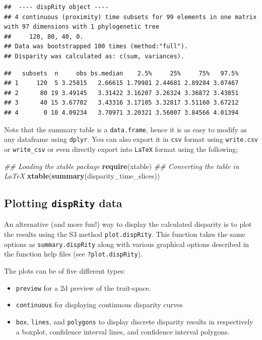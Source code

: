 \documentclass[]{book}
\newenvironment{Shaded}{\begin{snugshade}}{\end{snugshade}}
\newcommand{\CommentTok}[1]{\textcolor[rgb]{0.56,0.35,0.01}{\textit{#1}}}
\newcommand{\KeywordTok}[1]{\textcolor[rgb]{0.13,0.29,0.53}{\textbf{#1}}}
\newcommand{\NormalTok}[1]{#1}
\providecommand{\tightlist}{%
  \setlength{\itemsep}{0pt}\setlength{\parskip}{0pt}}
\begin{document}
\begin{verbatim}
##  ---- dispRity object ---- 
## 4 continuous (proximity) time subsets for 99 elements in one matrix with 97 dimensions with 1 phylogenetic tree
##     120, 80, 40, 0.
## Data was bootstrapped 100 times (method:"full").
## Disparity was calculated as: c(sum, variances).
\end{verbatim}

\begin{verbatim}
##   subsets  n     obs bs.median    2.5%     25%     75%   97.5%
## 1     120  5 3.25815   2.66615 1.79981 2.44681 2.89284 3.07467
## 2      80 19 3.49145   3.31422 3.16207 3.26324 3.36872 3.43851
## 3      40 15 3.67702   3.43316 3.17105 3.32817 3.51160 3.67212
## 4       0 10 4.09234   3.70971 3.20321 3.56007 3.84566 4.01394
\end{verbatim}

Note that the summary table is a \texttt{data.frame}, hence it is as easy to modify as any dataframe using \texttt{dplyr}.
You can also export it in \texttt{csv} format using \texttt{write.csv} or \texttt{write\_csv} or even directly export into \texttt{LaTeX} format using the following;

\begin{Shaded}
\begin{Highlighting}[]
\CommentTok{## Loading the xtable package}
\KeywordTok{require}\NormalTok{(xtable)}
\CommentTok{## Converting the table in LaTeX}
\KeywordTok{xtable}\NormalTok{(}\KeywordTok{summary}\NormalTok{(disparity_time_slices))}
\end{Highlighting}
\end{Shaded}

\hypertarget{plotting-disprity-data}{%
\subsection{\texorpdfstring{Plotting \texttt{dispRity} data}{Plotting dispRity data}}\label{plotting-disprity-data}}

An alternative (and more fun!) way to display the calculated disparity is to plot the results using the S3 method \texttt{plot.dispRity}.
This function takes the same options as \texttt{summary.dispRity} along with various graphical options described in the function help files (see \texttt{?plot.dispRity}).

The plots can be of five different types:

\begin{itemize}
\tightlist
\item
  \texttt{preview} for a 2d preview of the trait-space.
\item
  \texttt{continuous} for displaying continuous disparity curves
\item
  \texttt{box}, \texttt{lines}, and \texttt{polygons} to display discrete disparity results in respectively a boxplot, confidence interval lines, and confidence interval polygons.
\end{itemize}
\end{document}
